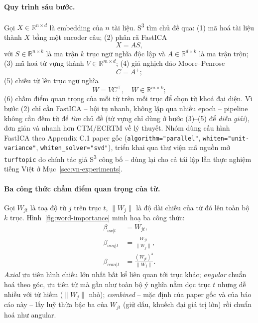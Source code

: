 \documentclass[11pt]{article}
\begin{document}
\paragraph{Quy trình sáu bước.} Gọi $X \in \mathbb{R}^{n \times d}$ là
embedding của $n$ tài liệu. S\textsuperscript{3} tìm chủ đề qua: (1) mã
hoá tài liệu thành $X$ bằng một encoder câu; (2) phân rã FastICA
\begin{equation}
    X = A S,
    \label{eq:generative}
\end{equation}
với $S \in \mathbb{R}^{n\times k}$ là ma trận $k$ trục ngữ nghĩa độc lập
và $A \in \mathbb{R}^{d\times k}$ là ma trận trộn; (3) mã hoá từ vựng
thành $V \in \mathbb{R}^{m\times d}$; (4) giả nghịch đảo Moore--Penrose
\begin{equation}
    C = A^{+};
    \label{eq:unmixing}
\end{equation}
(5) chiếu từ lên trục ngữ nghĩa
\begin{equation}
    W = V C^{\top}, \quad W \in \mathbb{R}^{m \times k};
    \label{eq:projection}
\end{equation}
(6) chấm điểm quan trọng của mỗi từ trên mỗi trục để chọn từ khoá đại
diện. Vì bước (2) chỉ cần FastICA -- hội tụ nhanh, không lặp qua nhiều
epoch -- pipeline không cần đếm từ để \emph{tìm} chủ đề (từ vựng chỉ dùng
ở bước (3)--(5) để \emph{diễn giải}), đơn giản và nhanh hơn CTM/ECRTM về
lý thuyết. Nhóm dùng cấu hình FastICA theo Appendix C.1 paper gốc
(\texttt{algorithm="parallel"}, \texttt{whiten="unit-variance"},
\texttt{whiten\_solver="svd"}), triển khai qua thư viện mã nguồn mở
\texttt{turftopic} do chính tác giả S\textsuperscript{3} công bố -- dùng
lại cho cả tái lập lẫn thực nghiệm tiếng Việt ở Mục~\ref{sec:vn-experiments}.

\paragraph{Ba công thức chấm điểm quan trọng của từ.} Gọi $W_{jt}$ là toạ
độ từ $j$ trên trục $t$, $\|W_j\|$ là độ dài chiếu của từ đó lên toàn bộ
$k$ trục. Hình~\ref{fig:word-importance} minh hoạ ba công thức:
\begin{align}
    \beta_{ax|t} &= W_{jt}, \label{eq:beta-axial}\\
    \beta_{ang|t} &= \frac{W_{jt}}{\|W_j\|}, \label{eq:beta-angular}\\
    \beta_{com|t} &= \frac{(W_{jt})^{3}}{\|W_j\|}. \label{eq:beta-combined}
\end{align}
\emph{Axial} ưu tiên hình chiếu lớn nhất bất kể liên quan tới trục khác;
\emph{angular} chuẩn hoá theo góc, ưu tiên từ mà gần như toàn bộ ý nghĩa
nằm dọc trục $t$ nhưng dễ nhiễu với từ hiếm ($\|W_j\|$ nhỏ); \emph{combined}
-- mặc định của paper gốc và của báo cáo này -- lấy luỹ thừa bậc ba của
$W_{jt}$ (giữ dấu, khuếch đại giá trị lớn) rồi chuẩn hoá như angular.
\end{document}
